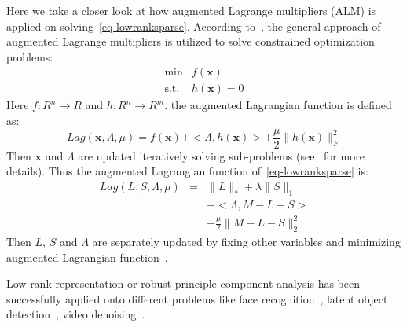 Here we take a closer look at how augmented Lagrange multipliers (ALM) is applied on solving~\eqref{eq-lowranksparse}.
According to~\cite{bertsekas1982constrained}, the general approach of augmented Lagrange multipliers is utilized to solve constrained optimization problems:
\begin{equation}
\label{eq-generalalm}
\begin{array}{cl}
\min & f(\mathbf{x})\\
\mathrm{s.t.} & h(\mathbf{x}) = 0
\end{array}
\end{equation}
Here $f: R^n\rightarrow R$ and $h: R^n\rightarrow R^m$.
the augmented Lagrangian function is defined as:
\begin{equation}
Lag(\mathbf{x},\Lambda,\mu)=f(\mathbf{x})+<\Lambda,h(\mathbf{x})>+\frac{\mu}{2}\|h(\mathbf{x})\|_F^2
\end{equation}
Then $\mathbf{x}$ and $\Lambda$ are updated iteratively solving sub-problems (see~\cite{bertsekas1999nonlinear} for more details).
Thus the augmented Lagrangian function of~\eqref{eq-lowranksparse} is:
\begin{equation}
\label{eq-lowrankalm}
\begin{array}{ccl}
Lag(L,S,\Lambda,\mu)& =& \|L\|_* + \lambda\|S\|_1 \\
& &+ <\Lambda,M-L-S>\\
& & +\frac{\mu}{2}\|M-L-S\|_2^2
\end{array}
\end{equation}
Then $L$, $S$ and $\Lambda$ are separately updated by fixing other variables and minimizing augmented Lagrangian function~\cite{lin2010augmented}.

Low rank representation or robust principle component analysis has been successfully applied onto different problems like face recognition~\cite{ma2012sparse}, latent object detection~\cite{shen2012unified}, video denoising~\cite{ji2010robust}.

